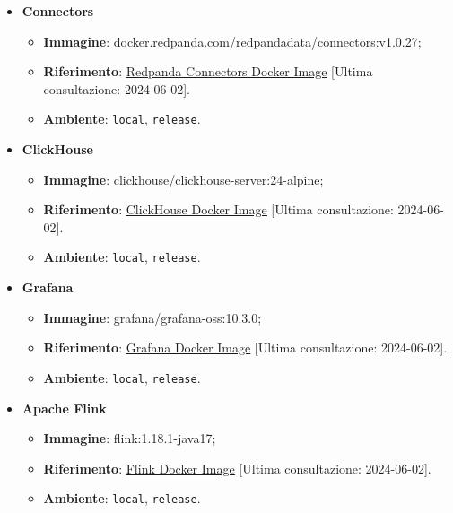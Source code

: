 \begin{itemize}
	\item \textbf{Connectors}
	      \begin{itemize}
		      \item \textbf{Immagine}: docker.redpanda.com/redpandadata/connectors:v1.0.27;
		      \item \textbf{Riferimento}: \underline{\href{https://hub.docker.com/r/redpandadata/connectors}{Redpanda Connectors Docker Image}} [Ultima consultazione: 2024-06-02].
		      \item \textbf{Ambiente}: \texttt{local}, \texttt{release}.
	      \end{itemize}

	\item \textbf{ClickHouse}
	      \begin{itemize}
		      \item \textbf{Immagine}: clickhouse/clickhouse-server:24-alpine;
		      \item \textbf{Riferimento}: \underline{\href{https://hub.docker.com/r/clickhouse/clickhouse-server}{ClickHouse Docker Image}} [Ultima consultazione: 2024-06-02].
		      \item \textbf{Ambiente}: \texttt{local}, \texttt{release}.
	      \end{itemize}

	\item \textbf{Grafana}
	      \begin{itemize}
		      \item \textbf{Immagine}: grafana/grafana-oss:10.3.0;
		      \item \textbf{Riferimento}: \underline{\href{https://hub.docker.com/r/grafana/grafana-oss}{Grafana Docker Image}} [Ultima consultazione: 2024-06-02].
		      \item \textbf{Ambiente}: \texttt{local}, \texttt{release}.
	      \end{itemize}

	\item \textbf{Apache Flink}
	      \begin{itemize}
		      \item \textbf{Immagine}: flink:1.18.1-java17;
		      \item \textbf{Riferimento}: \underline{\href{https://hub.docker.com/_/flink}{Flink Docker Image}} [Ultima consultazione: 2024-06-02].
		      \item \textbf{Ambiente}: \texttt{local}, \texttt{release}.
	      \end{itemize}
\end{itemize}


